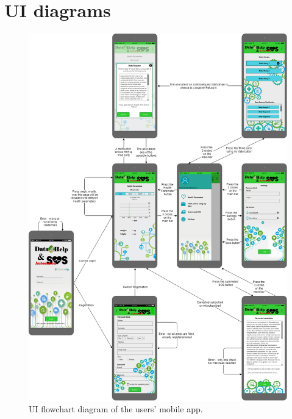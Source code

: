 \section{UI diagrams}
\begin{figure}[h!]
	\centering
	\includegraphics[width=1.0\textwidth]{./pictures/UI_flowchart_diagram.png}\par
	\caption{UI flowchart diagram of the users' mobile app.}
\end{figure}
\FloatBarrier
